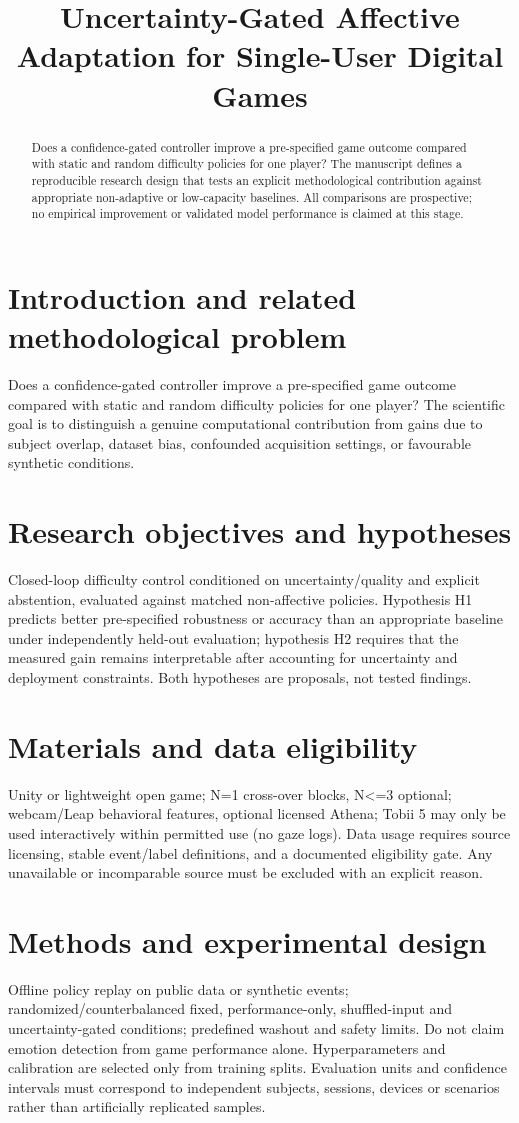 \documentclass[11pt,a4paper]{article}
\title{Uncertainty-Gated Affective Adaptation for Single-User Digital Games}
\author{}
\date{}
\begin{document}
\maketitle
\begin{abstract}
Does a confidence-gated controller improve a pre-specified game outcome compared with static and random difficulty policies for one player? The manuscript defines a reproducible research design that tests an explicit methodological contribution against appropriate non-adaptive or low-capacity baselines. All comparisons are prospective; no empirical improvement or validated model performance is claimed at this stage.
\end{abstract}
\section{Introduction and related methodological problem}
Does a confidence-gated controller improve a pre-specified game outcome compared with static and random difficulty policies for one player? The scientific goal is to distinguish a genuine computational contribution from gains due to subject overlap, dataset bias, confounded acquisition settings, or favourable synthetic conditions.
\section{Research objectives and hypotheses}
Closed-loop difficulty control conditioned on uncertainty/quality and explicit abstention, evaluated against matched non-affective policies. Hypothesis H1 predicts better pre-specified robustness or accuracy than an appropriate baseline under independently held-out evaluation; hypothesis H2 requires that the measured gain remains interpretable after accounting for uncertainty and deployment constraints. Both hypotheses are proposals, not tested findings.
\section{Materials and data eligibility}
Unity or lightweight open game; N=1 cross-over blocks, N<=3 optional; webcam/Leap behavioral features, optional licensed Athena; Tobii 5 may only be used interactively within permitted use (no gaze logs). Data usage requires source licensing, stable event/label definitions, and a documented eligibility gate. Any unavailable or incomparable source must be excluded with an explicit reason.
\section{Methods and experimental design}
Offline policy replay on public data or synthetic events; randomized/counterbalanced fixed, performance-only, shuffled-input and uncertainty-gated conditions; predefined washout and safety limits. Do not claim emotion detection from game performance alone. Hyperparameters and calibration are selected only from training splits. Evaluation units and confidence intervals must correspond to independent subjects, sessions, devices or scenarios rather than artificially replicated samples.
\end{document}
